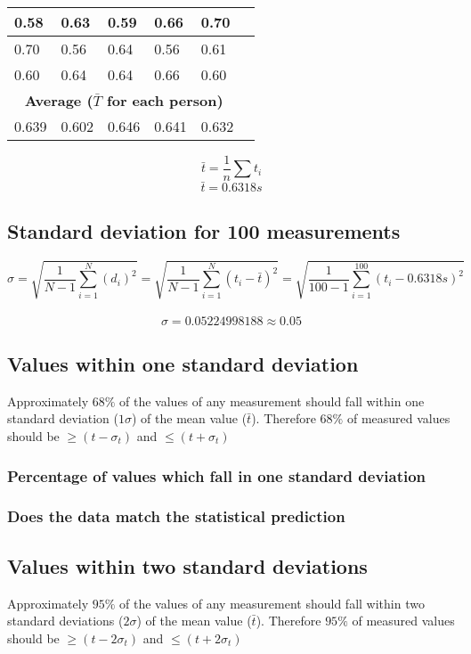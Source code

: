 \documentclass[11pt, letterpaper, includehead]{article}
\begin{document}
\begin{center}
\begin{tabular}{|   m{2cm}  |  m{2cm}  |  m{2cm}  |  m{2cm}  |  m{2cm}  |  m{2cm}  | }
    \hline
    0.58          & 0.63           & 0.59         & 0.66           & 0.70          \\
    \hline
    0.70          & 0.56           & 0.64         & 0.56           & 0.61          \\
    \hline
    0.60          & 0.64           & 0.64         & 0.66           & 0.60          \\
    \hline
    \hline
    \multicolumn{5}{|c|}{\textbf{Average ($\bar{T}$ for each person)}} \\
    \hline
    0.639         & 0.602          & 0.646        & 0.641          & 0.632         \\
    \hline
  \end{tabular}
\end{center}


$$\bar{t} = \frac{1}{n}\sum t_i$$
$$\boxed{\bar{t} = 0.6318s}$$

\subsection{Standard deviation for 100 measurements} %


$$\sigma = \sqrt{\frac{1}{N - 1}\sum_{i = 1}^{N} (d_i)^2} = \sqrt{\frac{1}{N - 1}\sum_{i = 1}^{N} (t_i - \bar{t})^2}= \sqrt{\frac{1}{100 - 1}\sum_{i = 1}^{100}(t_i - 0.6318s)^2}$$\\
$$\sigma = 0.05224998188 \approx 0.05$$


\subsection{Values within one standard deviation} %
Approximately $68\%$ of the values of any measurement should fall within one
standard deviation ($1 \sigma$) of the mean value ($\bar{t}$). Therefore $68\%$ of measured
values should be $\geq (t - \sigma_t)$ and $\leq (t + \sigma_t)$

\subsubsection{Percentage of values which fall in one standard deviation}

\subsubsection{Does the data match the statistical prediction}

\subsection{Values within two standard deviations} %
Approximately $95\%$ of the values of any measurement should fall within two
standard deviations ($2 \sigma$) of the mean value ($\bar{t}$). Therefore $95\%$ of measured
values should be $\geq (t - 2 \sigma_t)$ and $\leq (t + 2 \sigma_t)$
\end{document}
